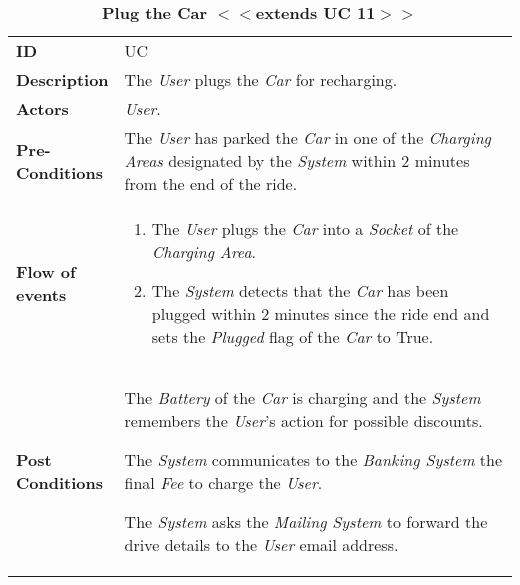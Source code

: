 \begin{longtable}{|p{0.2\linewidth} | p{0.8\linewidth}|}
	\captionsetup{labelformat=empty} %
	\caption{\textbf{Plug the Car $<<$extends UC 11$>>$}} %
	\label{UC_PlugCar}%
	\\ \hline %
	
	\textbf{ID} & UC\theUseCaseIdCounter \\ \hline
	\textbf{Description} & The \emph{User} plugs the \emph{Car} for recharging. \\ \hline
	\textbf{Actors} & \emph{User}.\\ \hline
	\textbf{Pre-Conditions} & The \emph{User} has parked the \emph{Car} in one of the \emph{Charging Areas} designated by the \emph{System} within 2 minutes from the end of the ride. \\ \hline
	\textbf{Flow of events} & 
	\begin{enumerate}
		\item The \emph{User} plugs the \emph{Car} into a \emph{Socket} of the \emph{Charging Area}. 
		\item The \emph{System} detects that the \emph{Car} has been plugged within 2 minutes since the ride end and sets the \emph{Plugged} flag of the \emph{Car} to True.
	\end{enumerate}	 \\ \hline
	\textbf{Post Conditions} & The \emph{Battery} of the \emph{Car} is charging and the \emph{System} remembers the \emph{User}'s action for possible discounts.
	
	The \emph{System} communicates to the \emph{Banking System} the final \emph{Fee} to charge the \emph{User}. 
	
	The \emph{System} asks the \emph{Mailing System} to forward the drive details to the \emph{User} email address. \\ \hline

\end{longtable}

